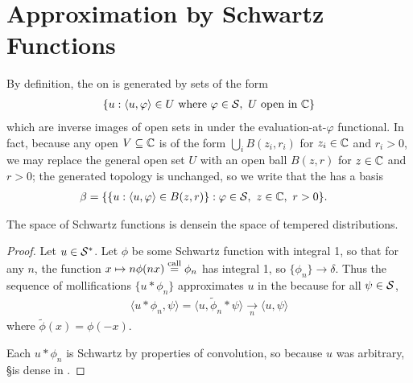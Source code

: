   \section{Approximation by Schwartz Functions}
    By definition, the \ws on \SS is generated by sets of the form 
    \begin{align*}
      \{u:\langle u,\varphi\rangle \in U\text{ where }\varphi\in\S,~U\text{ open in }\C\}
    \end{align*}
    which are inverse images of open sets in \C under the evaluation-at-$\varphi$ functional.
    In fact, because any open $V\subseteq\C$ is of the form $\bigcup_i B(z_i,r_i)$ for $z_i\in\C$ and $r_i>0$, we may replace the general open set $U$ with an open ball $B(z,r)$ for $z\in\C$ and $r>0$; the generated topology is unchanged, so we write that the \ws has a basis
    \begin{align*}
      \beta &=
      \{\{u:\langle u,\varphi\rangle \in B(z,r)\}:\varphi\in\S,~z\in\C,~r>0 \}\text{.}
    \end{align*}

    \begin{thm}
      \label{thm:sdenseinss}
      The space of Schwartz functions is dense\footnotemark in the space of tempered distributions.
    \end{thm}
    \begin{proof}
      Let $u\in\SS$.
      Let $\phi$ be some Schwartz function with integral 1, so that for any $n$, the function $x\mapsto n\phi(nx) \call \phi_n$ has integral 1, so $\{\phi_n\}\rightarrow\delta$.
      Thus the sequence of mollifications $\{u*\phi_n\}$ approximates $u$ in the \ws because for all $\psi\in\S$, 
      \begin{align*}
        \langle u*\phi_n, \psi\rangle = \langle u, \tilde{\phi}_n*\psi\rangle \underset{n}{\longrightarrow} \langle u,\psi\rangle
      \end{align*}
      where $\tilde\phi(x) = \phi(-x)$.

      Each $u*\phi_n$ is Schwartz by properties of convolution, so because $u$ was arbitrary, \S is dense in \SS.
    \end{proof}


